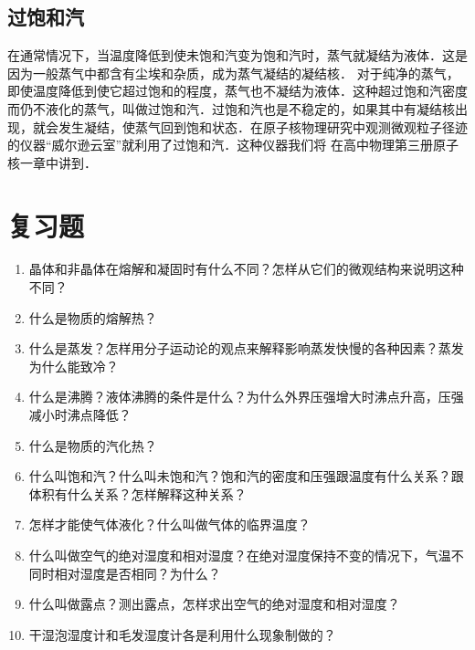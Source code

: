 \subsection*{过饱和汽} 
在通常情况下，当温度降低到使未饱和汽变为饱和汽时，蒸气就凝结为液体．这是因为一般蒸气中都含有尘埃和杂质，成为蒸气凝结的凝结核．
对于纯净的蒸气，即使温度降低到使它超过饱和的程度，蒸气也不凝结为液体．这种超过饱和汽密度而仍不液化的蒸气，叫做过饱和汽．过饱和汽也是不稳定的，如果其中有凝结核出现，就会发生凝结，使蒸气回到饱和状态．在原子核物理研究中观测微观粒子径迹的仪器“威尔逊云室”就利用了过饱和汽．这种仪器我们将
在高中物理第三册原子核一章中讲到．


\section*{复习题}
\begin{enumerate}
    \item 晶体和非晶体在熔解和凝固时有什么不同？怎样从它们的微观结构来说明这种不同？
    \item 什么是物质的熔解热？
    \item 什么是蒸发？怎样用分子运动论的观点来解释影响蒸发快慢的各种因素？蒸发为什么能致冷？
    \item 什么是沸腾？液体沸腾的条件是什么？为什么外界压强增大时沸点升高，压强减小时沸点降低？
    \item 什么是物质的汽化热？
    \item 什么叫饱和汽？什么叫未饱和汽？饱和汽的密度和压强跟温度有什么关系？跟体积有什么关系？怎样解释这种关系？
    \item 怎样才能使气体液化？什么叫做气体的临界温度？
    \item 什么叫做空气的绝对湿度和相对湿度？在绝对湿度保持不变的情况下，气温不同时相对湿度是否相同？为什么？
    \item 什么叫做露点？测出露点，怎样求出空气的绝对湿度和相对湿度？
    \item 干湿泡湿度计和毛发湿度计各是利用什么现象制做的？
\end{enumerate}


